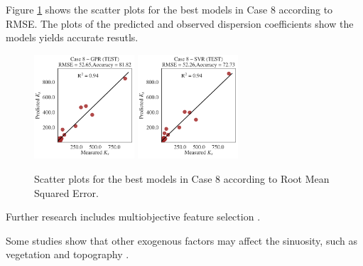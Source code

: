 \documentclass[a4paper,12pt, english]{article}
\begin{document}
Figure \ref{fig:eml____300dpi_scatter_best_model_new___ldc} shows the scatter plots for the best models in Case 8 according to RMSE.
The plots of the predicted and observed dispersion coefficients show the models yields accurate resutls.

\begin{figure}[!htb] \centering 
 \includegraphics[width=0.33245\textwidth]{./scatter/eml____300dpi_scatter_best_model___gpr__case_8__test}
 \includegraphics[width=0.33245\textwidth]{./scatter/eml____300dpi_scatter_best_model___svr__case_8__test}
 \caption{\label{fig:eml____300dpi_scatter_best_model_new___ldc}
 Scatter plots for the best models in Case 8 according to Root Mean Squared Error.}
\end{figure}


Further research includes multiobjective feature selection \cite{jimenez:2017}.



Some studies show that other exogenous factors may affect the sinuosity, such as vegetation \cite{camporeale:2010, savickis:2016} and topography \cite{timar:2003, dijk2013sinuosity}.


\end{document}
